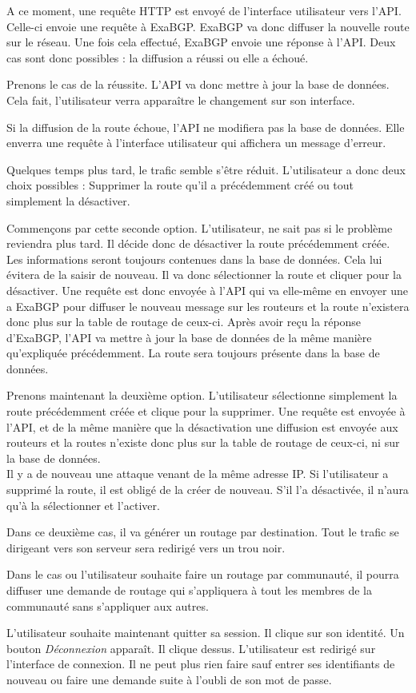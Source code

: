 A ce moment, une requête HTTP est envoyé de l'interface utilisateur vers l'API. Celle-ci envoie une requête à ExaBGP. ExaBGP va donc diffuser la nouvelle route sur le réseau. Une fois cela effectué, ExaBGP envoie une réponse à l'API. Deux cas sont donc possibles : la diffusion a réussi ou elle a échoué. 

Prenons le cas de la réussite. L'API va donc mettre à jour la base de données. Cela fait, l'utilisateur verra apparaître le changement sur son interface.

Si la diffusion de la route échoue, l'API ne modifiera pas la base de données. Elle enverra une requête à l'interface utilisateur qui affichera un message d'erreur.

Quelques temps plus tard, le trafic semble s'être réduit. L'utilisateur a donc deux choix possibles : Supprimer la route qu'il a précédemment créé ou tout simplement la désactiver.

Commençons par cette seconde option. L'utilisateur, ne sait pas si le problème reviendra plus tard. Il décide donc de désactiver la route précédemment créée. Les informations seront toujours contenues dans la base de données. Cela lui évitera de la saisir de nouveau. Il va donc sélectionner la route et cliquer pour la désactiver. Une requête est donc envoyée à l'API qui va elle-même en envoyer une a ExaBGP pour diffuser le nouveau message sur les routeurs et la route n'existera donc plus sur la table de routage de ceux-ci. Après avoir reçu la réponse d'ExaBGP, l'API va mettre à jour la base de données de la même manière qu'expliquée précédemment. La route sera toujours présente dans la base de données. 

Prenons maintenant la deuxième option. L'utilisateur sélectionne simplement la route précédemment créée et clique pour la supprimer. Une requête est envoyée à l'API, et de la même manière que la désactivation une diffusion est envoyée aux routeurs et la routes n'existe donc plus sur la table de routage de ceux-ci, ni sur la base de données. \\ \indent
Il y a de nouveau une attaque venant de la même adresse IP. Si l'utilisateur a supprimé la route, il est obligé de la créer de nouveau. S'il l'a désactivée, il n'aura qu'à la sélectionner et l'activer.

Dans ce deuxième cas, il va générer un routage par destination. Tout le trafic se dirigeant vers son serveur sera redirigé vers un trou noir. 



Dans le cas ou l'utilisateur souhaite faire un routage par communauté, il pourra diffuser une demande de routage qui s'appliquera à tout les membres de la communauté sans s'appliquer aux autres.

L'utilisateur souhaite maintenant quitter sa session. Il clique sur son identité. Un bouton \textit{Déconnexion} apparaît. Il clique dessus. L'utilisateur est redirigé sur l'interface de connexion. Il ne peut plus rien faire sauf entrer ses identifiants de nouveau ou faire une demande suite à l'oubli de son mot de passe.

